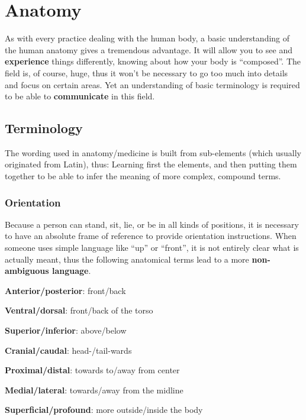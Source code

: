\chapter{Anatomy}\label{ch:anatomy}

As with every practice dealing with the human body, a basic understanding of the human anatomy gives a tremendous advantage.
It will allow you to see and \textbf{experience} things differently, knowing about how your body is ``composed''.
The field is, of course, huge, thus it won't be necessary to go too much into details and focus on certain areas.
Yet an understanding of basic terminology is required to be able to \textbf{communicate} in this field.

\section{Terminology}\label{sec:terminology}

The wording used in anatomy/medicine is built from sub-elements (which usually originated from Latin), thus:
Learning first the elements, and then putting them together to be able to infer the meaning of more complex, compound terms.

\subsection{Orientation}

Because a person can stand, sit, lie, or be in all kinds of positions, it is necessary to have an absolute frame of reference to provide orientation instructions.
When someone uses simple language like ``up'' or ``front'', it is not entirely clear what is actually meant, thus the following anatomical terms lead to a more \textbf{non-ambiguous language}.

\begin{itemize*}
    \item \textbf{Anterior/posterior}: front/back
    \item \textbf{Ventral/dorsal}: front/back of the torso
    \item \textbf{Superior/inferior}: above/below
    \item \textbf{Cranial/caudal}: head-/tail-wards
    \item \textbf{Proximal/distal}: towards to/away from center
    \item \textbf{Medial/lateral}: towards/away from the midline
    \item \textbf{Superficial/profound}: more outside/inside the body
\end{itemize*}

